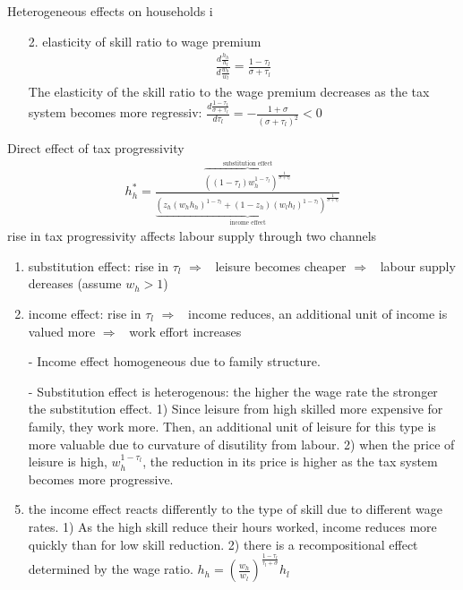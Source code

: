 \documentclass[11pt,aspectratio=169]{beamer}
\newcommand{\ar}{$\Rightarrow$ \ }
\begin{document}
\begin{frame}{Heterogeneous effects on households i}
	\hypertarget{opth}{}
	\begin{enumerate}
		\item[2.] elasticity of skill ratio to wage premium
		\begin{align*}
		\frac{d\frac{h_h}{h_l}}{d\frac{w_h}{w_l}}=\frac{1-\tau_l}{\sigma +\tau_l}
		\end{align*}
		The elasticity of the skill ratio to the wage premium decreases as the tax system becomes more regressiv: $\frac{d\frac{1-\tau_l}{\sigma+\tau_l}}{d \tau_l}=-\frac{1+\sigma}{(\sigma+\tau_l)^2}<0$
	\end{enumerate}
\end{frame}
\begin{frame}[shrink]{Direct effect of tax progressivity}
\vspace{-9mm}
\begin{align*}
h_h^*=\frac{\overbrace{\left((1-\tau_l)w_h^{1-\tau_l}\right)^{\frac{1}{\sigma+\tau_l}}}^{\text{substitution effect}}}{\underbrace{\left(z_h(w_hh_h)^{1-\tau_l}+(1-z_h)(w_lh_l)^{1-\tau_l}\right)^{\frac{1}{\sigma+\tau_l}}}_{\text{income effect}}}
		\end{align*}
		rise in tax progressivity affects labour supply through two channels
		\begin{enumerate}			
			\item substitution effect: rise in $\tau_l$ \ar leisure becomes cheaper \ar labour supply dereases (assume $w_h>1$)
			\item income effect: rise in $\tau_l$ \ar income reduces, an additional unit of income is valued more \ar work effort increases
			\item[-]  Income effect homogeneous due to family structure. 
			\item[-] Substitution effect  is heterogenous: the higher the wage rate the stronger the substitution effect.  1) Since leisure from high skilled more expensive for family, they work more. Then, an additional unit of leisure for this type is more valuable due to curvature of disutility from labour. 2) when the price of leisure is high, $w_h^{1-\tau_l}$, the reduction in its price is higher as the tax system becomes more progressive. 
			\item the income effect reacts differently to the type of skill due to different wage rates. 1) As the high skill reduce their hours worked, income reduces more quickly than for low skill reduction. 2) there is a recompositional effect determined by the wage ratio. $h_h=\left(\frac{w_h}{w_l}\right)^{\frac{1-\tau_l}{\tau_l+\sigma}}h_l$
		\end{enumerate}
	 

\end{frame}
\end{document}
